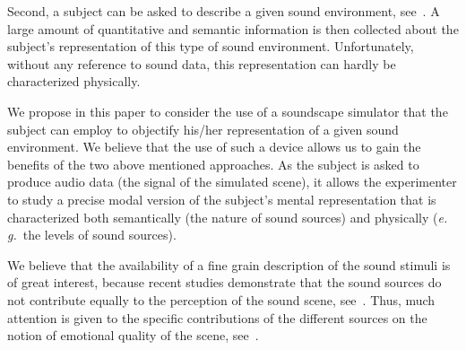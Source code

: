 \documentclass[12pt]{elsarticle}
\newcommand{\ie}{\emph{i.\,e.}}
\newcommand{\eg}{\emph{e.\,g.}}
\begin{document}
Second, a subject can be asked to describe a given sound environment, see~\cite{guastavino2006ideal, dubois2006cognitive}. A large amount of quantitative and semantic information is then collected about the subject's representation of this type of sound environment. Unfortunately, without any reference to sound data, this representation can hardly be characterized physically.


We propose in this paper to consider the use of a soundscape simulator that the subject can employ to objectify his/her representation of a given sound environment. We believe that the use of such a device allows us to gain the benefits of the two above mentioned approaches. As the subject is asked to produce audio data (the signal of the simulated scene), it allows the experimenter to study a precise modal version of the subject's mental representation that is characterized both semantically (the nature of sound sources) and physically (\eg~the levels of sound sources).


We believe that the availability of a fine grain description of the sound stimuli is of great interest, because recent studies demonstrate that the sound sources do not contribute equally to the perception of the sound scene, see~\cite{defreville2004aactivity,lavandier2006contribution,guastavino2006ideal,nilsson2007soundscape,szeremeta2009analysis}. Thus, much attention is given to the specific contributions of the different sources on the notion of emotional quality of the scene, see~\cite{gozalo2015relationship,ricciardi2015sound}.
\end{document}
